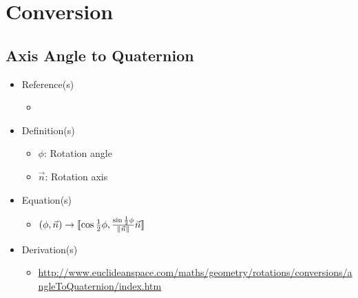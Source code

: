 \documentclass[letterpaper]{article}
\begin{document}
\newpage
	\section{Conversion}
	
	\subsection{Axis Angle to Quaternion}
	\begin{itemize}
		\item Reference(s)
			\begin{itemize}
				\item \cite{Baker2008}
			\end{itemize}
		\item Definition(s)
			\begin{itemize}
				\item $\phi$: Rotation angle
				\item $\vec{n}$: Rotation axis
			\end{itemize}
		\item Equation(s)
			\begin{itemize}
				\item $\left(\phi,\vec{n}\right) \rightarrow \llbracket \cos{\frac{1}{2}\phi}, \frac{\sin{\frac{1}{2}\phi}}{\left\|\vec{n}\right\|} \vec{n} \rrbracket$
			\end{itemize}
		\item Derivation(s)
			\begin{itemize}
				\item \url{http://www.euclideanspace.com/maths/geometry/rotations/conversions/angleToQuaternion/index.htm}
			\end{itemize}
	\end{itemize}
	
\end{document}
